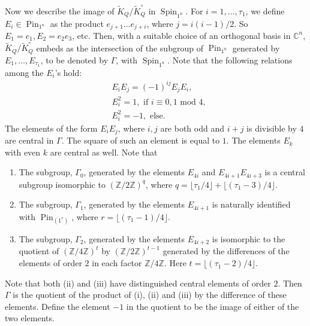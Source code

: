 \documentclass[12pt]{amsart}
\newcommand{\C}{\mathbb{C}}
\newcommand{\Z}{\mathbb{Z}}
\theoremstyle{definition}
\numberwithin{equation}{section}
\begin{document}
Now we describe the image of $\tilde{K}_Q/\tilde{K}_Q^\circ$ in $\operatorname{Spin}_{1^n}$.
For $i=1,\ldots,\tau_1$, we define $E_i\in \operatorname{Pin}_{1^n}$
as the product  $e_{j+1}\ldots e_{j+i}$, where $j=i(i-1)/2$. So
$E_1=e_1, E_2=e_2e_3$, etc. Then, with a suitable choice of an orthogonal
basis in $\C^n$,  $\tilde{K}_Q/\tilde{K}_Q^\circ$ embeds as
the intersection of the subgroup of $\operatorname{Pin}_{1^n}$
generated by $E_1,\ldots, E_{\tau_1}$, to be denoted by $\Gamma$, with $\operatorname{Spin}_{1^n}$.
Note that the following relations among the $E_i$'s hold:
\begin{equation}\label{eq:E_relations}
\begin{split}
& E_i E_j=(-1)^{ij}E_j E_i,\\
& E_i^2=1, \text{ if } i\equiv 0,1\text{ mod }4,\\
& E_i^2=-1, \text{ else}.
\end{split}
\end{equation}
The elements of the form $E_iE_j$, where $i,j$ are both odd and $i+j$ is divisible by
$4$ are central in $\Gamma$. The square of such an element is equal to $1$. The elements $E_k$
with even $k$ are central as well.
Note that
\begin{enumerate}
\item[(i)]  The subgroup, $\Gamma_0$, generated
by the elements $E_{4i}$ and $E_{4i+1}E_{4i+3}$ is a  central subgroup
isomorphic to $(\Z/2\Z)^{q}$, where $q=\lfloor \tau_1/4\rfloor+\lfloor (\tau_1-3)/4\rfloor$.
\item[(ii)] The subgroup, $\Gamma_1$, generated by the elements $E_{4i+1}$ is naturally
identified with $\operatorname{Pin}_{(1^r)}$, where $r=\lfloor (\tau_1-1)/4\rfloor$.
\item[(iii)] The subgroup, $\Gamma_2$, generated by the elements $E_{4i+2}$ is
isomorphic to the quotient of $(\Z/4\Z)^{t}$ by $(\Z/2\Z)^{t-1}$ generated
by the differences of the elements of order $2$ in each factor $\Z/4\Z$. Here $t=\lfloor (\tau_1-2)/4\rfloor$.
\end{enumerate}
Note that both (ii) and (iii) have distinguished central elements of order $2$.
Then $\Gamma$ is the quotient of  the product of (i), (ii) and (iii)
by the difference of these elements. 
Define the element $-1$ in the quotient to be the image of either
of the two elements.
\end{document}
